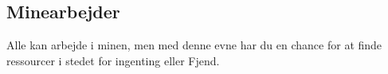 \subsection{Minearbejder}
Alle kan arbejde i minen, men med denne evne har du en chance for at finde ressourcer i stedet for ingenting eller Fjend.
